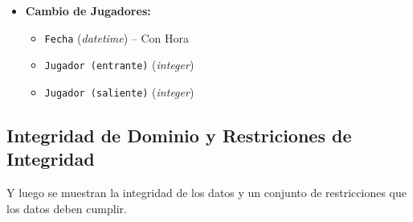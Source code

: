 \documentclass{report}
\begin{document}
\begin{itemize}
        \item \textbf{Cambio de Jugadores:}
        \begin{itemize}
            \item \texttt{Fecha} (\textit{datetime}) -- Con Hora
            \item \texttt{Jugador (entrante)} (\textit{integer}) 
            \item \texttt{Jugador (saliente)} (\textit{integer}) \newline
        \end{itemize}
            
    \end{itemize}

    \subsection*{Integridad de Dominio y Restriciones de Integridad}
    
    Y luego se muestran la integridad de los datos y un conjunto de restricciones que los datos deben cumplir.
\end{document}
